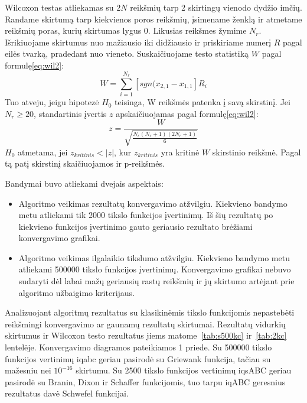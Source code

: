 \documentclass{VUMIFKompMagistrinis}
\begin{document}

Wilcoxon testas atliekamas su $2N$ reikšmių tarp 2 skirtingų vienodo dydžio imčių. Randame skirtumą tarp kiekvienos poros reikšmių, įsimename ženklą ir atmetame reikšmių poras, kurių skirtumas lygus 0. Likusias reikšmes žymime $N_{r}$. Išrikiuojame skirtumus nuo mažiausio iki didžiausio ir priskiriame numerį $R$ pagal eilės tvarką, pradedant nuo vieneto. Suskaičiuojame testo statistiką $W$ pagal formulę\eqref{eq:wil2}:
\begin{equation}\label{eq:wil1}
    W = \sum^{N_{r}}_{i=1} [sgn(x_{2,1}-x_{1,1}] R_{i}
\end{equation}
Tuo atveju, jeigu hipotezė $H_{0}$ teisinga, W reikšmės patenka į savą skirstinį. Jei $N_{r} \geq 20$,  standartinis įvertis $z$ apskaičiuojamas pagal formulę\eqref{eq:wil2}:
\begin{equation}\label{eq:wil2}
    z = \frac{W}{\sqrt{\frac{N_{r}(N_{r}+1)(2N_{r}+1)}{6}}}
\end{equation}
$H_{0}$ atmetama, jei $z_{kritinis} < |z|$, kur  $z_{kritinis}$ yra kritinė $W$ skirstinio reikšmė. Pagal tą patį skirstinį skaičiuojamos ir p-reikšmės.



Bandymai buvo atliekami dvejais aspektais:
\begin{itemize}
    \item Algoritmo veikimas rezultatų konvergavimo atžvilgiu. Kiekvieno bandymo metu atliekami tik 2000 tikslo funkcijos įvertinimų. Iš šių rezultatų po kiekvieno funkcijos įvertinimo gauto geriausio rezultato brėžiami konvergavimo grafikai.
    \item Algoritmo veikimas ilgalaikio tikslumo atžvilgiu. Kiekvieno bandymo metu atliekami 500000 tikslo funkcijos įvertinimų. Konvergavimo grafikai nebuvo sudaryti dėl labai mažų geriausių rastų reikšmių ir jų skirtumo artėjant prie algoritmo užbaigimo kriterijaus.
\end{itemize}

Analizuojant algoritmų rezultatus su klasikinėmis tikslo funkcijomis nepastebėti reikšmingi konvergavimo ar gaunamų rezultatų skirtumai. Rezultatų vidurkių skirtumus ir Wilcoxon testo rezultatus jiems matome~\ref{tab:s500kc} ir~\ref{tab:2kc} lentelėje. Konvergavimo diagramos pateikiamos 1 priede. Su 500000 tikslo funkcijos vertinimų iqabc geriau pasirodė su Griewank funkcija, tačiau su mažesniu nei $10^{-16}$ skirtumu. Su 2500 tikslo funkcijos vertinimų iqsABC geriau pasirodė su Branin, Dixon ir Schaffer funkcijomis, tuo tarpu iqABC geresnius rezultatus davė Schwefel funkcijai.
\end{document}
